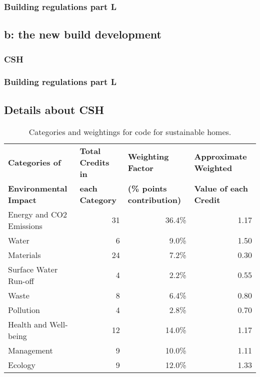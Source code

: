 \documentclass[a4paper,fleqn]{article}
\renewcommand{\section}{\newpage\stdsection}
\renewcommand{\cite}{\citep}
\begin{document}
\subsubsection*{Building regulations part L}


\subsection*{b: the new build development}
\subsubsection*{CSH}


\subsubsection*{Building regulations part L}




\appendix

\section{Appendix}

\subsection{Details about CSH}
\begin{table}[H]
	\begin{center}
		\begin{tabular}{| l | r | r | r |}
		\hline
			\multicolumn{1}{|l|}{\textbf{Categories of}} & \multicolumn{1}{l|}{\textbf{Total Credits in}} & 
				\multicolumn{1}{l|}{\textbf{Weighting Factor}} & \multicolumn{1}{l|}{\textbf{Approximate Weighted}}\\
			\multicolumn{1}{|l|}{\textbf{Environmental Impact}} & \multicolumn{1}{l|}{\textbf{each Category}} & 
				\multicolumn{1}{l|}{\textbf{(\% points contribution)}} & \multicolumn{1}{l|}{\textbf{Value of each Credit}}\\
			\hline
			Energy and CO2 Emissions & 31 & 36.4\% & 1.17\\
			\hline
			Water & 6 & 9.0\% & 1.50\\
			\hline
			Materials & 24 & 7.2\% & 0.30\\
			\hline
			Surface Water Run-off & 4 & 2.2\% & 0.55\\
			\hline
			Waste & 8 & 6.4\% & 0.80\\
			\hline
			Pollution & 4 & 2.8\% & 0.70\\
			\hline
			Health and Well-being & 12 & 14.0\% & 1.17\\
			\hline
			Management & 9 & 10.0\% & 1.11\\
			\hline
			Ecology & 9 & 12.0\% & 1.33\\
			\hline
		\end{tabular}
	\caption{Categories and weightings for code for sustainable homes. \cite{Communities&LocalGovernment2010d}}
	\label{tab:cshWeighting}
	\end{center}
\end{table}
\end{document}
